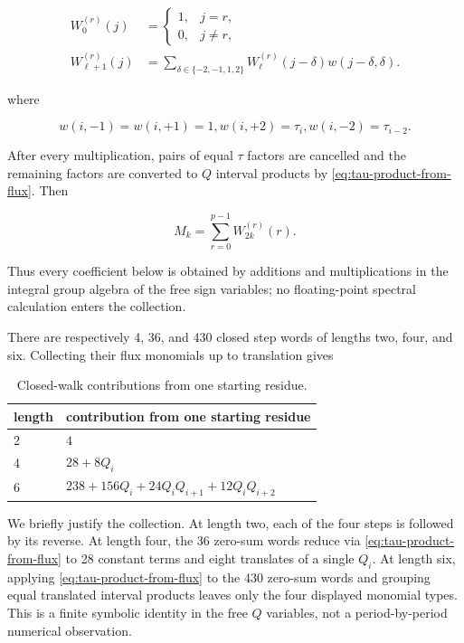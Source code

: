 \begin{equation}
\label{eq:walk-recurrence}
\begin{aligned}W_0^{(r)}(j)&=\begin{cases}1,&j=r,\\0,&j\ne r,\end{cases}\\
W_{\ell+1}^{(r)}(j)&=\sum_{\delta\in\{-2,-1,1,2\}}W_{\ell}^{(r)}(j-\delta)w(j-\delta,\delta).
\end{aligned}
\end{equation}

where

\begin{equation}
w(i,-1)=w(i,+1)=1,   w(i,+2)=\tau_i,   w(i,-2)=\tau_{i-2}.
\end{equation}

After every multiplication, pairs of equal \(\tau\) factors are cancelled and
the remaining factors are converted to \(Q\) interval products by \eqref{eq:tau-product-from-flux}. Then

\begin{equation}
\label{eq:walk-moment}
M_k=\sum_{r=0}^{p-1} W_{2k}^{(r)}(r).
\end{equation}

Thus every coefficient below is obtained by additions and multiplications in
the integral group algebra of the free sign variables; no floating-point
spectral calculation enters the collection.

There are respectively 4, 36, and 430 closed step words of lengths two, four,
and six. Collecting their flux monomials up to translation gives

\begin{table}[tbp]
\centering
\caption{Closed-walk contributions from one starting residue.}
\label{tab:closed-walk-contributions}
\begingroup
\renewcommand{\arraystretch}{1.12}
\begin{tabular}{ll}
\toprule
length & contribution from one starting residue \\
\midrule
2 & \(4\) \\
4 & \(28+8Q_i\) \\
6 & \(238+156Q_i+24Q_iQ_{i+1}+12Q_iQ_{i+2}\) \\
\bottomrule
\end{tabular}
\endgroup
\end{table}

We briefly justify the collection. At length two, each of the four steps is
followed by its reverse. At length four, the 36 zero-sum words reduce via
\eqref{eq:tau-product-from-flux} to 28 constant terms and eight translates of a single \(Q_i\). At length
six, applying \eqref{eq:tau-product-from-flux} to the 430 zero-sum words and grouping equal translated
interval products leaves only the four displayed monomial types. This is a
finite symbolic identity in the free \(Q\) variables, not a period-by-period
numerical observation.

